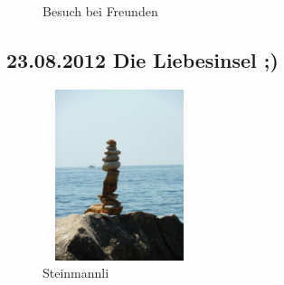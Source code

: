 \begin{figure}[H]
   \centering
   \quad
   \quad
   \quad
   \caption[Besuch bei Freunden]{Besuch bei Freunden}
\end{figure}

\subsection{23.08.2012 Die Liebesinsel ;)}

\begin{figure} 
  \begin{centering}
    \includegraphics[width=0.4\textwidth, height=5cm, keepaspectratio]{../Bilder/Sommer2012/100.jpg}
    \caption{Steinmannli}
  \end{centering}
\end{figure} 


